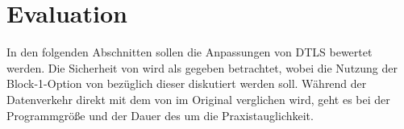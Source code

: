 \chapter{Evaluation}
\label{chp:evaluation}

In den folgenden Abschnitten sollen die Anpassungen von DTLS bewertet werden. Die Sicherheit von  wird als gegeben betrachtet, wobei
die Nutzung der Block-1-Option von  bezüglich dieser diskutiert werden soll. Während der Datenverkehr direkt mit dem von
 im Original verglichen wird, geht es bei der Programmgröße und der Dauer des  um die Praxistauglichkeit.




